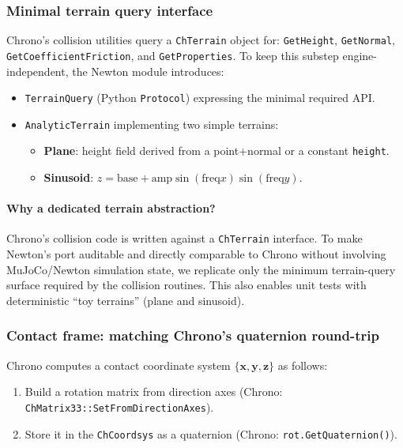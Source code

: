 \subsubsection{Minimal terrain query interface}
Chrono's collision utilities query a \texttt{ChTerrain} object for:
\texttt{GetHeight}, \texttt{GetNormal}, \texttt{GetCoefficientFriction}, and \texttt{GetProperties}.
To keep this substep engine-independent, the Newton module introduces:
\begin{itemize}
  \item \texttt{TerrainQuery} (Python \texttt{Protocol}) expressing the minimal required API.
  \item \texttt{AnalyticTerrain} implementing two simple terrains:
    \begin{itemize}
      \item \textbf{Plane}: height field derived from a point+normal or a constant \texttt{height}.
      \item \textbf{Sinusoid}: \(z = \text{base} + \text{amp}\sin(\text{freq}x)\sin(\text{freq}y)\).
    \end{itemize}
\end{itemize}

\paragraph{Why a dedicated terrain abstraction?}
Chrono's collision code is written against a \texttt{ChTerrain} interface.
To make Newton's port auditable and directly comparable to Chrono without involving MuJoCo/Newton simulation state,
we replicate only the minimum terrain-query surface required by the collision routines.
This also enables unit tests with deterministic ``toy terrains'' (plane and sinusoid).

\subsubsection{Contact frame: matching Chrono's quaternion round-trip}
Chrono computes a contact coordinate system \(\{\mathbf{x},\mathbf{y},\mathbf{z}\}\) as follows:
\begin{enumerate}
  \item Build a rotation matrix from direction axes (Chrono: \texttt{ChMatrix33::SetFromDirectionAxes}).
  \item Store it in the \texttt{ChCoordsys} as a quaternion (Chrono: \texttt{rot.GetQuaternion()}).
\end{enumerate}

